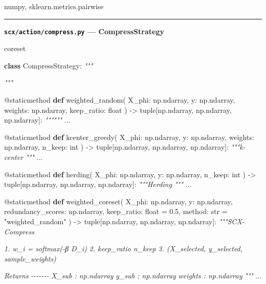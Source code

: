\documentclass[
  12pt,
]{article}
\newenvironment{Shaded}{}{}
\newcommand{\AttributeTok}[1]{\textcolor[rgb]{0.49,0.56,0.16}{#1}}
\newcommand{\BuiltInTok}[1]{\textcolor[rgb]{0.00,0.50,0.00}{#1}}
\newcommand{\CommentTok}[1]{\textcolor[rgb]{0.38,0.63,0.69}{\textit{#1}}}
\newcommand{\FloatTok}[1]{\textcolor[rgb]{0.25,0.63,0.44}{#1}}
\newcommand{\KeywordTok}[1]{\textcolor[rgb]{0.00,0.44,0.13}{\textbf{#1}}}
\newcommand{\NormalTok}[1]{#1}
\newcommand{\OperatorTok}[1]{\textcolor[rgb]{0.40,0.40,0.40}{#1}}
\newcommand{\StringTok}[1]{\textcolor[rgb]{0.25,0.44,0.63}{#1}}
\begin{document}
numpy, sklearn.metrics.pairwise

\begin{center}\rule{0.5\linewidth}{0.5pt}\end{center}

\textbf{\texttt{scx/action/compress.py} --- CompressStrategy}

 coreset

\begin{Shaded}
\begin{Highlighting}[]
\KeywordTok{class}\NormalTok{ CompressStrategy:}
    \CommentTok{"""}

\CommentTok{    }
\CommentTok{    """}

    \AttributeTok{@staticmethod}
    \KeywordTok{def}\NormalTok{ weighted\_random(}
\NormalTok{        X\_phi: np.ndarray,}
\NormalTok{        y: np.ndarray,}
\NormalTok{        weights: np.ndarray,}
\NormalTok{        keep\_ratio: }\BuiltInTok{float}
\NormalTok{    ) }\OperatorTok{{-}\textgreater{}} \BuiltInTok{tuple}\NormalTok{[np.ndarray, np.ndarray, np.ndarray]:}
        \CommentTok{""""""}
\NormalTok{        ...}

    \AttributeTok{@staticmethod}
    \KeywordTok{def}\NormalTok{ kcenter\_greedy(}
\NormalTok{        X\_phi: np.ndarray,}
\NormalTok{        y: np.ndarray,}
\NormalTok{        weights: np.ndarray,}
\NormalTok{        n\_keep: }\BuiltInTok{int}
\NormalTok{    ) }\OperatorTok{{-}\textgreater{}} \BuiltInTok{tuple}\NormalTok{[np.ndarray, np.ndarray, np.ndarray]:}
        \CommentTok{"""k{-}center """}
\NormalTok{        ...}

    \AttributeTok{@staticmethod}
    \KeywordTok{def}\NormalTok{ herding(}
\NormalTok{        X\_phi: np.ndarray,}
\NormalTok{        y: np.ndarray,}
\NormalTok{        n\_keep: }\BuiltInTok{int}
\NormalTok{    ) }\OperatorTok{{-}\textgreater{}} \BuiltInTok{tuple}\NormalTok{[np.ndarray, np.ndarray, np.ndarray]:}
        \CommentTok{"""Herding """}
\NormalTok{        ...}

    \AttributeTok{@staticmethod}
    \KeywordTok{def}\NormalTok{ weighted\_coreset(}
\NormalTok{        X\_phi: np.ndarray,}
\NormalTok{        y: np.ndarray,}
\NormalTok{        redundancy\_scores: np.ndarray,}
\NormalTok{        keep\_ratio: }\BuiltInTok{float} \OperatorTok{=} \FloatTok{0.5}\NormalTok{,}
\NormalTok{        method: }\BuiltInTok{str} \OperatorTok{=} \StringTok{"weighted\_random"}
\NormalTok{    ) }\OperatorTok{{-}\textgreater{}} \BuiltInTok{tuple}\NormalTok{[np.ndarray, np.ndarray, np.ndarray]:}
        \CommentTok{"""SCX{-}Compress}

\CommentTok{        1.  w\_i = softmax({-}β  D\_i)}
\CommentTok{        2.  keep\_ratio  n\_keep }
\CommentTok{        3.  (X\_selected, y\_selected, sample\_weights)}

\CommentTok{        Returns}
\CommentTok{        {-}{-}{-}{-}{-}{-}{-}}
\CommentTok{        X\_sub : np.ndarray  }
\CommentTok{        y\_sub : np.ndarray  }
\CommentTok{        weights : np.ndarray  }
\CommentTok{        """}
\NormalTok{        ...}
\end{Highlighting}
\end{Shaded}
\end{document}

